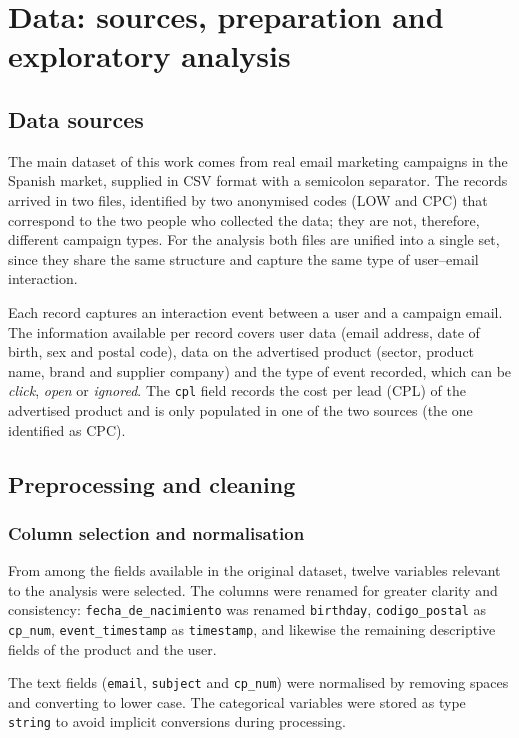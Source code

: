 \chapter{Data: sources, preparation and exploratory analysis}
\label{cap:datos}

\section{Data sources}

The main dataset of this work comes from real email marketing campaigns in the Spanish market, supplied in CSV format with a semicolon separator. The records arrived in two files, identified by two anonymised codes (LOW and CPC) that correspond to the two people who collected the data; they are not, therefore, different campaign types. For the analysis both files are unified into a single set, since they share the same structure and capture the same type of user--email interaction.

Each record captures an interaction event between a user and a campaign email. The information available per record covers user data (email address, date of birth, sex and postal code), data on the advertised product (sector, product name, brand and supplier company) and the type of event recorded, which can be \textit{click}, \textit{open} or \textit{ignored}. The \texttt{cpl} field records the cost per lead (CPL) of the advertised product and is only populated in one of the two sources (the one identified as CPC).

\section{Preprocessing and cleaning}

\subsection{Column selection and normalisation}

From among the fields available in the original dataset, twelve variables relevant to the analysis were selected. The columns were renamed for greater clarity and consistency: \texttt{fecha\_de\_nacimiento} was renamed \texttt{birthday}, \texttt{codigo\_postal} as \texttt{cp\_num}, \texttt{event\_timestamp} as \texttt{timestamp}, and likewise the remaining descriptive fields of the product and the user.

The text fields (\texttt{email}, \texttt{subject} and \texttt{cp\_num}) were normalised by removing spaces and converting to lower case. The categorical variables were stored as type \texttt{string} to avoid implicit conversions during processing.

